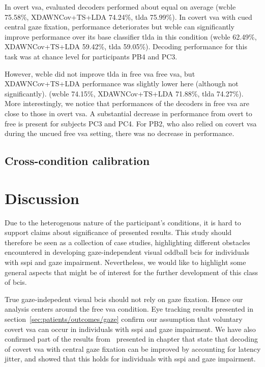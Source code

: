 In overt \ac{vsa}, evaluated decoders performed about equal on average
(\ac{wcble} 75.58\%, XDAWNCov+TS+LDA 74.24\%, \ac{tlda} 75.99\%).
In covert \ac{vsa} with cued central gaze fixation, performance deteriorates
but \ac{wcble} can significantly improve performance over its base classifier
\ac{tlda} in this condition
(\ac{wcble} 62.49\%, XDAWNCov+TS+LDA 59.42\%, \ac{tlda} 59.05\%).
Decoding performance for this task was at chance level for participants PB4 and
PC3.

However, \Ac{wcble} did not improve \ac{tlda} in free \ac{vsa} free \ac{vsa}, but
XDAWNCov+TS+LDA performance was slightly lower here (although not
significantly).
(\ac{wcble} 74.15\%, XDAWNCov+TS+LDA 71.88\%, \ac{tlda} 74.27\%).
More interestingly, we notice that performances of the decoders in free
\ac{vsa} are close to those in overt \ac{vsa}.
A substantial decrease in performance from overt to free is present for
subjects PC3 and PC4.
For PB2, who also relied on covert \ac{vsa} during the uncued free \ac{vsa}
setting, there was no decrease in performance.

\subsection{Cross-condition calibration}
\label{sec:patients/outcomes/cross}


\section{Discussion}

Due to the heterogenous nature of the participant's conditions, it is hard to support
claims about significance of presented results.
This study should therefore be seen as a collection of case studies,
highlighting different obstacles encountered in developing gaze-independent
visual oddball \acp{bci} for individuals with \ac{sspi} and gaze impairment.
Nevertheless, we would like to highlight some general aspects that might be
of interest for the further development of this class of \acp{bci}.

True gaze-indepedent visual \acp{bci} should not rely on gaze fixation.
Hence our analysis centers around the free \ac{vsa} condition.
Eye tracking results presented in section~\ref{sec:patients/outcomes/gaze}
confirm our assumption that voluntary covert \ac{vsa} can
occur in individuals with \ac{sspi} and gaze impairment.
We have also confirmed part of the results from~\textcite{VanDenKerchove2024} presented in
chapter that state that decoding of covert \ac{vsa} with central gaze
fixation can be improved by accounting for latency jitter, and showed that this
holds for individuals with \ac{sspi} and gaze impairment.

